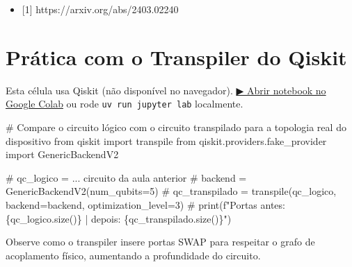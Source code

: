 \documentclass[
  brazilian,
]{report}
\newenvironment{Shaded}{\begin{snugshade}}{\end{snugshade}}
\newcommand{\CommentTok}[1]{\textcolor[rgb]{0.37,0.37,0.37}{#1}}
\newcommand{\ImportTok}[1]{\textcolor[rgb]{0.00,0.46,0.62}{#1}}
\newcommand{\NormalTok}[1]{\textcolor[rgb]{0.00,0.23,0.31}{#1}}
\providecommand{\tightlist}{%
  \setlength{\itemsep}{0pt}\setlength{\parskip}{0pt}}
\begin{document}
\begin{itemize}
\tightlist
\item
  {[}1{]} https://arxiv.org/abs/2403.02240
\end{itemize}

\section{Prática com o Transpiler do
Qiskit}\label{pruxe1tica-com-o-transpiler-do-qiskit}

\begin{tcolorbox}[enhanced jigsaw, arc=.35mm, bottomrule=.15mm, bottomtitle=1mm, breakable, colback=white, colbacktitle=quarto-callout-warning-color!10!white, colframe=quarto-callout-warning-color-frame, coltitle=black, left=2mm, leftrule=.75mm, opacityback=0, opacitybacktitle=0.6, rightrule=.15mm, title=\textcolor{quarto-callout-warning-color}{\faExclamationTriangle}\hspace{0.5em}{⚛️ Célula Qiskit --- execute no Colab ou localmente}, titlerule=0mm, toprule=.15mm, toptitle=1mm]

Esta célula usa Qiskit (não disponível no navegador).
\href{https://colab.research.google.com/github/maxwellamaral/aula-quantum/blob/main/notebooks/07-quantum-fourier-transform.ipynb}{▶
Abrir notebook no Google Colab} ou rode \texttt{uv\ run\ jupyter\ lab}
localmente.

\begin{Shaded}
\begin{Highlighting}[]
\CommentTok{\# Compare o circuito lógico com o circuito transpilado para a topologia real do dispositivo}
\ImportTok{from}\NormalTok{ qiskit }\ImportTok{import}\NormalTok{ transpile}
\ImportTok{from}\NormalTok{ qiskit.providers.fake\_provider }\ImportTok{import}\NormalTok{ GenericBackendV2}

\CommentTok{\# qc\_logico = ... circuito da aula anterior}
\CommentTok{\# backend = GenericBackendV2(num\_qubits=5)}
\CommentTok{\# qc\_transpilado = transpile(qc\_logico, backend=backend, optimization\_level=3)}
\CommentTok{\# print(f"Portas antes: \{qc\_logico.size()\} | depois: \{qc\_transpilado.size()\}")}
\end{Highlighting}
\end{Shaded}

\end{tcolorbox}

Observe como o transpiler insere portas SWAP para respeitar o grafo de
acoplamento físico, aumentando a profundidade do circuito.
\end{document}
